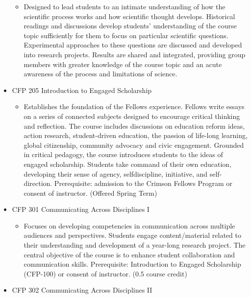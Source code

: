 \documentclass[
  letterpaper,
]{scrbook}
\providecommand{\tightlist}{%
  \setlength{\itemsep}{0pt}\setlength{\parskip}{0pt}}
\begin{document}
\begin{itemize}
  \begin{itemize}
  \tightlist
  \item
    Designed to lead students to an intimate understanding of how the
    scientific process works and how scientific thought develops.
    Historical readings and discussions develop students' understanding
    of the course topic sufficiently for them to focus on particular
    scientific questions. Experimental approaches to these questions are
    discussed and developed into research projects. Results are shared
    and integrated, providing group members with greater knowledge of
    the course topic and an acute awareness of the process and
    limitations of science.
  \end{itemize}
\item
  CFP 205 Introduction to Engaged Scholarship

  \begin{itemize}
  \tightlist
  \item
    Establishes the foundation of the Fellows experience. Fellows write
    essays on a series of connected subjects designed to encourage
    critical thinking and reflection. The course includes discussions on
    education reform ideas, action research, student-driven education,
    the passion of life-long learning, global citizenship, community
    advocacy and civic engagement. Grounded in critical pedagogy, the
    course introduces students to the ideas of engaged scholarship.
    Students take command of their own education, developing their sense
    of agency, selfdiscipline, initiative, and self-direction.
    Prerequisite: admission to the Crimson Fellows Program or consent of
    instructor. (Offered Spring Term)
  \end{itemize}
\item
  CFP 301 Communicating Across Disciplines I

  \begin{itemize}
  \tightlist
  \item
    Focuses on developing competencies in communication across multiple
    audiences and perspectives. Students engage content/material related
    to their understanding and development of a year-long research
    project. The central objective of the course is to enhance student
    collaboration and communication skills. Prerequisite: Introduction
    to Engaged Scholarship (CFP-100) or consent of instructor. (0.5
    course credit)
  \end{itemize}
\item
  CFP 302 Communicating Across Disciplines II


\end{itemize}
\end{document}
